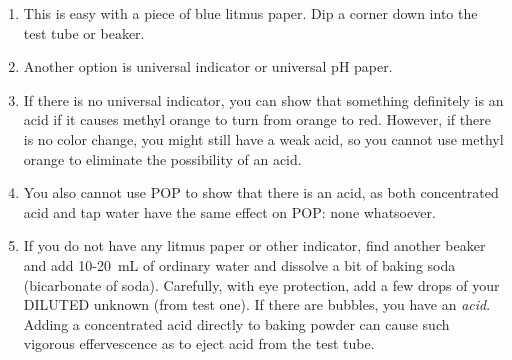 \begin{enumerate}
\item This is easy with a piece of blue litmus paper. 
Dip a corner down into the test tube or beaker. 


\item Another option is universal indicator or universal pH paper. 


\item If there is no universal indicator, 
you can show that something definitely is an acid 
if it causes methyl orange to turn from orange to red. 
However, 
if there is no color change, 
you might still have a weak acid, 
so you cannot use methyl orange to eliminate the possibility of an acid. 

\item You also cannot use POP to show that there is an acid, 
as both concentrated acid and tap water have the same effect on POP: 
none whatsoever.

\item If you do not have any litmus paper or other indicator, 
find another beaker and add 10-20~mL of ordinary water 
and dissolve a bit of baking soda (bicarbonate of soda). 
Carefully, 
with eye protection, 
add a few drops of your DILUTED unknown (from test one). 
If there are bubbles, 
you have an \emph{acid}. 
Adding a concentrated acid directly to baking powder 
can cause such vigorous effervescence as to eject acid from the test tube.
\end{enumerate}

